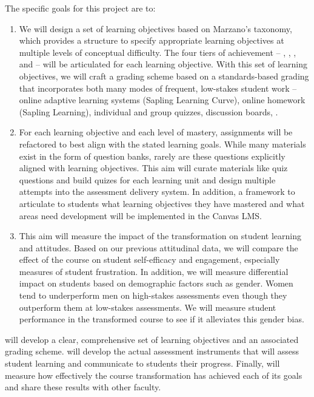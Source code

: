 \documentclass[10pt,letterpaper]{article}
\begin{document}
The specific goals for this project are to:
\begin{enumerate}[nosep,label=\textbf{\arabic*}.]
\item {} 
We will design a set of learning objectives  based on Marzano's taxonomy, which provides a structure to specify appropriate learning objectives at multiple levels of conceptual difficulty. The four tiers of achievement -- \Recall, \Comprehension, \Analysis, and \Use -- will be articulated for each learning objective. With this set of learning objectives, we will craft a grading scheme based on a standards-based grading that incorporates both many modes of frequent, low-stakes student work -- online adaptive learning systems (Sapling Learning Curve), online homework (Sapling Learning), individual and group quizzes, discussion boards, .

\item {}
For each learning objective and each level of mastery, assignments will be refactored to best align with the stated learning goals. While many materials exist in the form of question banks, rarely are these questions explicitly aligned with learning objectives. This aim will curate materials like quiz questions and build quizes for each learning unit and design multiple attempts into the assessment delivery system. In addition,  a framework to articulate to students what learning objectives they have mastered and what areas need development will be implemented in the Canvas LMS.

\item {}
This aim will measure the impact of the transformation on student learning and attitudes. Based on our previous attitudinal data, we will compare the effect of the course on student self-efficacy and engagement, especially measures of student frustration. In addition, we will measure differential impact on students based on demographic factors such as gender. Women tend to underperform men on high-stakes assessments even though they outperform them at low-stakes assessments. We will measure student performance in the transformed course to see if it alleviates this gender bias.
\end{enumerate}
 will develop a clear, comprehensive set of learning objectives and an associated grading scheme. 
 will develop the actual assessment instruments that will assess student learning and communicate to students their progress. Finally,  will measure how effectively the course transformation has achieved each of its goals and share these results with other faculty.
\end{document}
